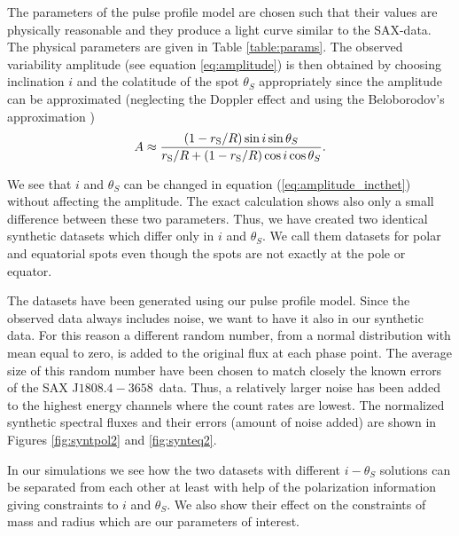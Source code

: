 \documentclass{wihuri}
\def\rg{r_{\rm S}} %
\def\be{\begin{equation}}
\def\ee{\end{equation}}
\def\rg{r_{\rm S}} %
\def\source{SAX J$1808.4-3658$}
\def\thetas{\theta_{S}}
\begin{document}
The parameters of the pulse profile model are chosen such that their values are physically reasonable and they produce a light curve similar to the SAX-data. The physical parameters are given in Table \ref{table:params}. The observed variability amplitude (see equation \ref{eq:amplitude}) is then obtained by choosing inclination $i$ and the colatitude of the spot $\thetas$ appropriately since the amplitude can be approximated (neglecting the Doppler effect and using the Beloborodov's approximation \cite{poutaviironen})
\be \label{eq:amplitude_incthet}
A \approx \frac{(1-\rg/R)\sin i \sin \thetas}{\rg/R+(1-\rg/R)\cos i \cos \thetas}.
\ee 

We see that $i$ and $\thetas$ can be changed in equation (\ref{eq:amplitude_incthet}) without affecting the amplitude. The exact calculation shows also only a small difference between these two parameters. Thus, we have created two identical synthetic datasets which differ only in $i$ and $\thetas$. We call them datasets for polar and equatorial spots even though the spots are not exactly at the pole or equator. 

The datasets have been generated using our pulse profile model. Since the observed data always includes noise, we want to have it also in our synthetic data. For this reason a different random number, from a normal distribution with mean equal to zero, is added to the original flux at each phase point. The average size of this random number have been chosen to match closely the known errors of the \source \ data. Thus, a relatively larger noise has been added to the highest energy channels where the count rates are lowest. The normalized synthetic spectral fluxes and their errors (amount of noise added) are shown in Figures \ref{fig:syntpol2} and \ref{fig:synteq2}.





In our simulations we see how the two datasets with different $i-\thetas$ solutions can be separated from each other at least with help of the polarization information giving constraints to $i$ and $\thetas$. We also show their effect on the constraints of mass and radius which are our parameters of interest. 
\end{document}
